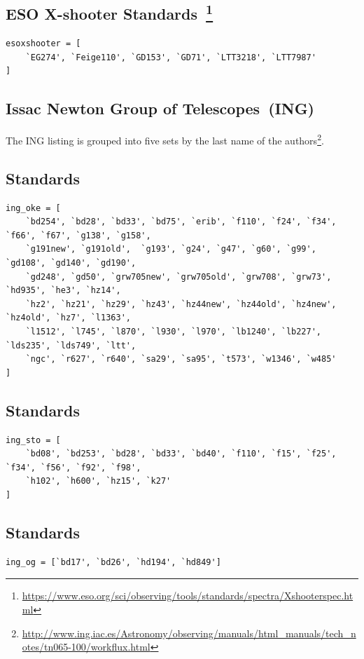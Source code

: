 \documentclass[twocolumn, linenumbers]{aastex631}
\begin{document}
\subsection*{ESO X-shooter Standards~\citep{2014Msngr.158...16M, 2014A&A...568A...9M}\footnote{\url{https://www.eso.org/sci/observing/tools/standards/spectra/Xshooterspec.html}}}
\begin{verbatim}
esoxshooter = [
    `EG274', `Feige110', `GD153', `GD71', `LTT3218', `LTT7987'
]
\end{verbatim}

\subsection{Issac Newton Group of Telescopes~(ING)}

The ING listing is grouped into five sets by the last name of the authors\footnote{\url{http://www.ing.iac.es/Astronomy/observing/manuals/html_manuals/tech_notes/tn065-100/workflux.html}}.
\subsection*{\citet{1990AJ.....99.1621O} Standards}
\begin{verbatim}
ing_oke = [
    `bd254', `bd28', `bd33', `bd75', `erib', `f110', `f24', `f34', `f66', `f67', `g138', `g158',
    `g191new', `g191old',  `g193', `g24', `g47', `g60', `g99', `gd108', `gd140', `gd190',
    `gd248', `gd50', `grw705new', `grw705old', `grw708', `grw73', `hd935', `he3', `hz14',
    `hz2', `hz21', `hz29', `hz43', `hz44new', `hz44old', `hz4new', `hz4old', `hz7', `l1363',
    `l1512', `l745', `l870', `l930', `l970', `lb1240', `lb227', `lds235', `lds749', `ltt',
    `ngc', `r627', `r640', `sa29', `sa95', `t573', `w1346', `w485'
]
\end{verbatim}

\subsection*{\citet{1977ApJ...218..767S} Standards}

\begin{verbatim}
ing_sto = [
    `bd08', `bd253', `bd28', `bd33', `bd40', `f110', `f15', `f25', `f34', `f56', `f92', `f98',
    `h102', `h600', `hz15', `k27'
]
\end{verbatim}


\subsection*{\citet{1965ApJ...141...83E} Standards}
\begin{verbatim}
ing_og = [`bd17', `bd26', `hd194', `hd849']
\end{verbatim}
\end{document}
